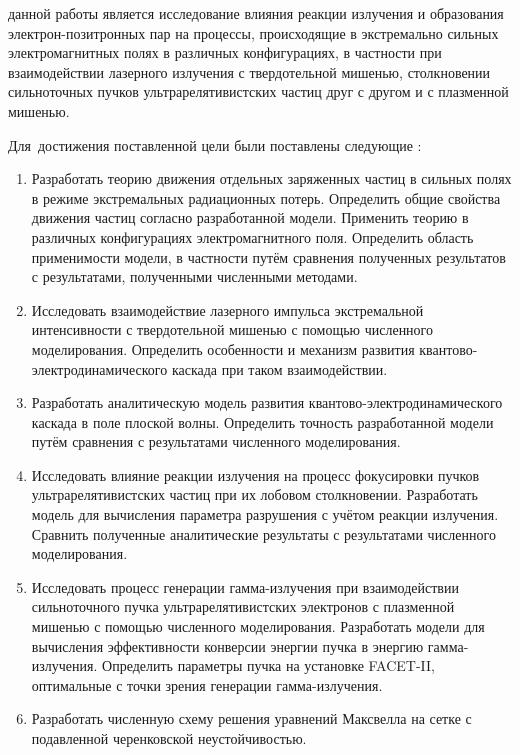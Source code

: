 \vspace{0.25cm}
{\aim} данной работы является исследование влияния реакции излучения и образования электрон-позитронных пар на процессы, происходящие в экстремально сильных электромагнитных полях в различных конфигурациях, в частности при взаимодействии лазерного излучения с твердотельной мишенью, столкновении сильноточных пучков ультрарелятивистских частиц друг с другом и с плазменной мишенью.

Для~достижения поставленной цели были поставлены следующие {\tasks}:
\begin{enumerate}[beginpenalty=10000] %
  \item Разработать теорию движения отдельных заряженных частиц в сильных полях в режиме экстремальных радиационных потерь. Определить общие свойства движения частиц согласно разработанной модели. Применить теорию в различных конфигурациях электромагнитного поля. Определить область применимости модели, в частности путём сравнения полученных результатов с результатами, полученными численными методами.
  \item Исследовать взаимодействие лазерного импульса экстремальной интенсивности с твердотельной мишенью с помощью численного моделирования. Определить особенности и механизм развития квантово-электро\-динамического каскада при таком взаимодействии.
  \item Разработать аналитическую модель развития квантово-электро\-динамического каскада в поле плоской волны. Определить точность разработанной модели путём сравнения с результатами численного моделирования.
  \item Исследовать влияние реакции излучения на процесс фокусировки пучков ультрарелятивистских частиц при их лобовом столкновении. Разработать модель для вычисления параметра разрушения с учётом реакции излучения. Сравнить полученные аналитические результаты с результатами численного моделирования.
  \item Исследовать процесс генерации гамма-излучения при взаимодействии сильноточного пучка ультрарелятивистских электронов с плазменной мишенью с помощью численного моделирования. Разработать модели для вычисления эффективности конверсии энергии пучка в энергию гамма-излучения. Определить параметры пучка на установке FACET-II, оптимальные с точки зрения генерации гамма-излучения.
  \item Разработать численную схему решения уравнений Максвелла на сетке с подавленной черенковской неустойчивостью.
\end{enumerate}

